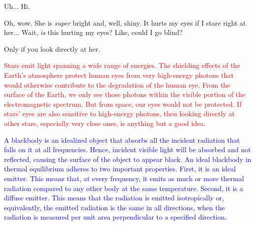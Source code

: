 \documentclass[main.tex]{subfiles}
\begin{document}
\par \Electra  Uh... Hi.

\par \Maia Oh, wow.  She is \textit{super} bright and, well, shiny.  It hurts my eyes if I stare right at her... Wait, \textit{is} this hurting my eyes?  Like, could I go blind?

\par \Pleione Only if you look directly at her.

\begin{tcolorbox}[sharp corners, colback=red!30, colframe=red!80!blue, title=Stellar Emission]
\par \textcolor{red} {Stars emit light spanning a wide range of energies.  The shielding effects of the Earth's atmosphere protect human eyes from very high-energy photons that would otherwise contribute to the degradation of the human eye.  From the surface of the Earth, we only see those photons within the visible portion of the electromagnetic spectrum.  But from space, our eyes would not be protected.  If stars' eyes are also sensitive to high-energy photons, then looking directly at other stars, especially very close ones, is anything but a good idea.}
\end{tcolorbox}

\begin{tcolorbox}[sharp corners, colback=blue!30, colframe=blue!80!blue, title=Blackbody]
\par \textcolor{blue} {A blackbody is an idealized object that absorbs all the incident radiation that falls on it at all frequencies.  Hence, incident visible light will be absorbed and not reflected, causing the surface of the object to appear black.  An ideal blackbody in thermal equilibrium adheres to two important properties.  First, it is an ideal emitter.  This means that, at every frequency, it emits as much or more thermal radiation compared to any other body at the same temperature.  Second, it is a diffuse emitter.  This means that the radiation is emitted isotropically or, equivalently, the emitted radiation is the same in all directions, when the radiation is measured per unit area perpendicular to a specified direction.}
\end{tcolorbox}
\end{document}
